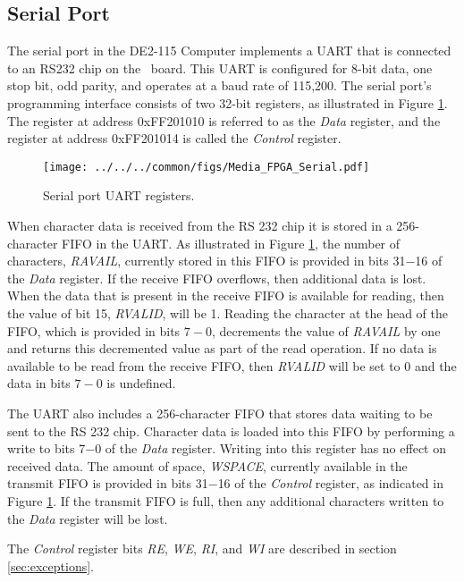 \subsection{Serial Port}
\label{sec:serial_port}

The serial port in the DE2-115 Computer implements a UART that is connected to an RS232
chip on the \DEBoard~board.  This UART is configured for 8-bit data, one stop bit, odd parity, and
operates at a baud rate of 115,200.  The serial port's programming interface 
consists of two 32-bit registers, as illustrated in Figure \ref{fig:serial_port}. 
The register at address {\sf 0xFF201010} is referred to as the
{\it Data} register, and the register at address {\sf 0xFF201014} is called the {\it
Control} register.

\begin{figure}[h!]
   \begin{center}
       \texttt{[image: ../../../common/figs/Media\_FPGA\_Serial.pdf]}
   \end{center}
   \caption{Serial port UART registers.}
	\label{fig:serial_port}
\end{figure}

When character data is received from the RS 232 chip it is stored in a 256-character
FIFO in the UART. As illustrated in Figure \ref{fig:serial_port}, the number 
of characters, {\it RAVAIL}, currently stored in this FIFO is
provided in bits 31$-$16 of the {\it Data} register.  If the receive FIFO overflows, then
additional data is lost.  When the data that is present in the receive FIFO is available 
for reading, then the value of bit 15, {\it RVALID}, will be 1. Reading the character at
the head of the FIFO, which is provided in bits $7-0$, decrements the value of {\it RAVAIL} 
by one and returns this decremented value as part of the read
operation. If no data is available to be read from the receive FIFO, then {\it RVALID} will 
be set to 0 and the data in bits $7-0$ is undefined.

The UART also includes a 256-character FIFO that stores data waiting to be sent to the RS 232
chip. Character data is loaded into this FIFO by performing a write to bits 7$-$0
of the {\it Data} register.  Writing into this register has no effect 
on received data.  The amount of space, {\it WSPACE}, currently available in the transmit FIFO is 
provided in bits 31$-$16 of the {\it Control} register, as indicated 
in Figure \ref{fig:serial_port}.  If
the transmit FIFO is full, then any additional characters written to the {\it Data} 
register will be lost.

The {\it Control} register bits {\it RE}, {\it WE}, {\it RI}, and {\it WI} are described 
in section \ref{sec:exceptions}.